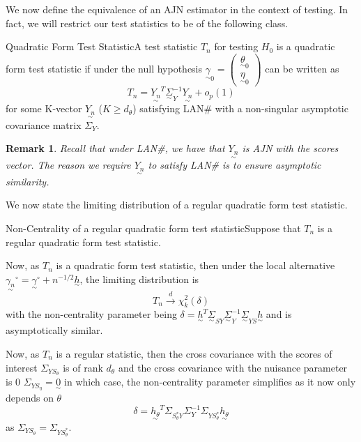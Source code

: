 \documentclass[twoside]{article}
\newtheorem{remark}[theorem]{Remark}
\newcommand{\utilde}{\underset{\sim}}
\begin{document}
We now define the equivalence of an AJN estimator in the context of testing. In fact, we will restrict our test statistics to be of the following class.

\begin{definition_exam}{Quadratic Form Test Statistic}{}A test statistic $T_n$ for testing $H_0$ is a quadratic form test statistic if under the null hypothesis $\utilde{\gamma}_0 = \begin{pmatrix}\utilde{\theta}_0 \\ \utilde{\eta}_0 \end{pmatrix}$ can be written as 
$$
T_n = \utilde{Y_n}^T\utilde{\Sigma}_Y^{-1}\utilde{Y_n} + o_p(1)
$$
for some K-vector $\utilde{Y_n}$ ($K \geq d_{\theta}$) satisfying LAN\# with a non-singular asymptotic covariance matrix $\Sigma_Y.$
\end{definition_exam}

\begin{remark} Recall that under LAN\#, we have that $\utilde{Y_n}$ is AJN with the scores vector. The reason we require $\utilde{Y_n}$ to satisfy LAN\# is to ensure asymptotic similarity.
\end{remark}

We now state the limiting distribution of a regular quadratic form test statistic.

\begin{proposition_exam}{Non-Centrality of a regular quadratic form test statistic}{}Suppose that $T_n$ is a regular quadratic form test statistic. 

Now, as $T_n$ is a quadratic form test statistic, then under the local alternative $\utilde{\gamma_n}^{\circ} = \utilde{\gamma}^{\circ} + n^{-1/2}\utilde{h}$, the limiting distribution is 
$$
T_n \xrightarrow{d} \chi_k^2(\delta)
$$
with the non-centrality parameter being $\delta = \utilde{h}^T\utilde{\Sigma}_{SY}\utilde{\Sigma}_{Y}^{-1}\utilde{\Sigma}_{YS}\utilde{h}$ and is asymptotically similar.

Now, as $T_n$ is a regular statistic, then the cross covariance with the scores of interest $\Sigma_{Y S_{\theta}}$ is of rank $d_{\theta}$ and the cross covariance with the nuisance parameter is 0
$
\Sigma_{Y S_{\eta}} = \utilde{0}
$
in which case, the non-centrality parameter simplifies as it now only depends on $\theta$
$$
\delta = \utilde{h_{\theta}}^T\Sigma_{S_{\theta}^{*}Y}\Sigma_{Y}^{-1}\Sigma_{YS_{\theta}^{*}}\utilde{h_{\theta}}
$$
as $\Sigma_{Y S_{\theta}} = \Sigma_{Y S_{\theta}^{*}}$.
\end{proposition_exam}
\end{document}
